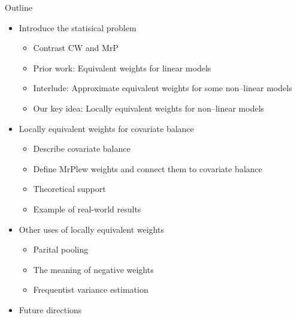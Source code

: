 

\begin{frame}{Outline}
%
%
\begin{itemize}
    \item Introduce the statisical problem
    \begin{itemize}
        \item Contrast CW and MrP
        \item Prior work: Equivalent weights for linear models
        \item Interlude: Approximate equivalent weights for some non--linear models
        \item Our key idea: Locally equivalent weights for non--linear models
    \end{itemize} \pause
    \item Locally equivalent weights for covariate balance
    \begin{itemize}
        \item Describe covariate balance
        \item Define MrPlew weights and connect them to covariate balance
        \item Theoretical support
        \item Example of real-world results
    \end{itemize} \pause
    \item Other uses of locally equivalent weights
    \begin{itemize}
            \item Parital pooling
            \item The meaning of negative weights
            \item Frequentist variance estimation
    \end{itemize}
    \item Future directions
\end{itemize}
%
\end{frame}
